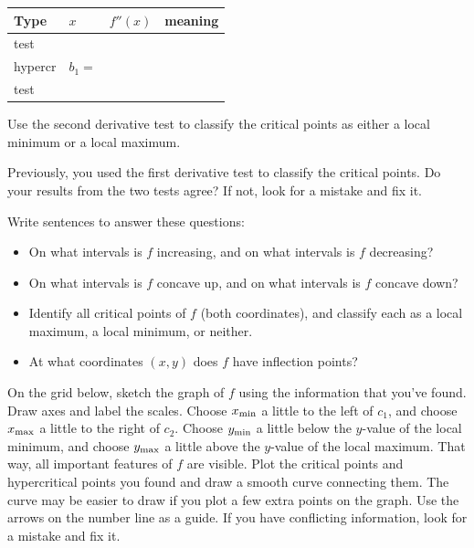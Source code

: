 \begin{ProblemSet}
\begin{Problem}[pencil space=0in]
  \newcommand{\Bx}[1]{\Strut[-0.25in]{0.75in}#1}
  \begin{tabular}{l|p{1in}|p{1in}|p{3in}}
    Type & $x$ & $f''(x)$ & meaning
    \\ \hline
    \Bx{test} & & &
    \\ \hline
    \Bx{hypercr} & \Bx{$b_1 = $} & &
    \\ \hline
    \Bx{test} & & &
    \\ \hline
  \end{tabular}

 \end{Problem}

 \begin{Problem}
  Use the second derivative test to classify the critical points as either a local minimum or a local maximum.
 \end{Problem}
 \begin{Problem}[pencil space=0in]
  Previously, you used the first derivative test to classify the critical points.
  Do your results from the two tests agree?
  If not, look for a mistake and fix it.
 \end{Problem}

 \begin{Problem}[pencil space=3in]
  Write sentences to answer these questions:
  \begin{itemize}
  \item On what intervals is $f$ increasing, and on what intervals is $f$ decreasing?
  \item On what intervals is $f$ concave up, and on what intervals is $f$ concave down?
  \item Identify all critical points of $f$ (both coordinates), and classify each as a local maximum, a local minimum, or neither.
  \item At what coordinates $(x,y)$ does $f$ have inflection points?
  \end{itemize}
 \end{Problem}

 \begin{Problem}
  On the grid below, sketch the graph of $f$ using the information that you've found.
  Draw axes and label the scales.
  Choose $x_\mathrm{min}$ a little to the left of $c_1$, and choose $x_\mathrm{max}$ a little to the right of $c_2$.
  Choose $y_\mathrm{min}$ a little below the $y$-value of the local minimum, and choose $y_\mathrm{max}$ a little above the $y$-value of the local maximum.
  That way, all important features of $f$ are visible.
  Plot the critical points and hypercritical points you found and draw a smooth curve connecting them.
  The curve may be easier to draw if you plot a few extra points on the graph.
  Use the arrows on the number line as a guide.
  If you have conflicting information, look for a mistake and fix it.

 \end{Problem}
\end{ProblemSet}

